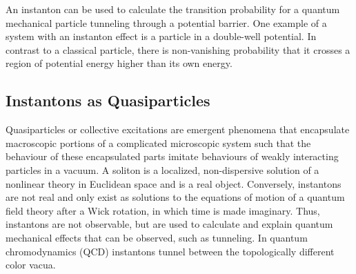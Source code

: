 \documentclass{article}
\begin{document}
    \clearpage
    An instanton can be used to calculate the transition probability for a quantum mechanical particle tunneling through a potential barrier. One example of a system with an instanton effect is a particle in a double-well potential. In contrast to a classical particle, there is non-vanishing probability that it crosses a region of potential energy higher than its own energy.

    
    
    \subsection{Instantons as Quasiparticles}
    
    
    
    
    
    
    Quasiparticles or collective excitations are emergent phenomena that encapsulate macroscopic portions of a complicated microscopic system such that the behaviour of these encapsulated parts imitate  behaviours of weakly interacting particles in a vacuum. 
    A soliton is a localized, non-dispersive solution of a nonlinear theory in Euclidean space and is a real object. Conversely, instantons are not real and only exist as solutions to the equations of motion of a quantum field theory after a Wick rotation, in which time is made imaginary. Thus, instantons are not observable, but are used to calculate and explain quantum mechanical effects that can be observed, such as tunneling. In quantum chromodynamics (QCD) instantons tunnel between the topologically different color vacua.
    
\end{document}

